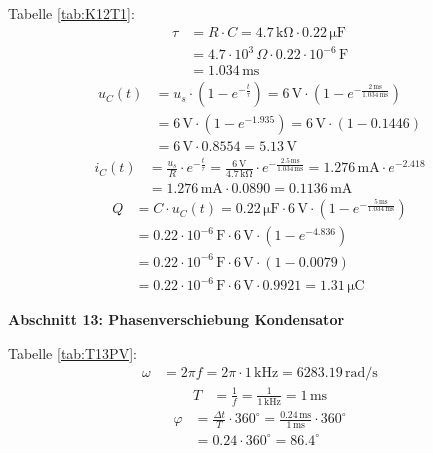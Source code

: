 Tabelle \ref{tab:K12T1}:
\begin{align*}
    \tau &= R \cdot C = 4.7 \, \mathrm{k\Omega} \cdot 0.22 \, \mathrm{\mu F} \\
    &= 4.7 \cdot 10^3 \, \Omega \cdot 0.22 \cdot 10^{-6} \, \mathrm{F} \\
    &= 1.034 \, \mathrm{ms}
\end{align*}
\begin{align*}
    u_C(t) &= u_s \cdot \left( 1 - e^{-\frac{t}{\tau}} \right) = 6 \, \mathrm{V} \cdot \left( 1 - e^{-\frac{2 \, \mathrm{ms}}{1.034 \, \mathrm{ms}}} \right) \\
    &= 6 \, \mathrm{V} \cdot \left( 1 - e^{-1.935} \right) = 6 \, \mathrm{V} \cdot \left( 1 - 0.1446 \right) \\
    &= 6 \, \mathrm{V} \cdot 0.8554 = 5.13 \, \mathrm{V}
\end{align*}
\begin{align*}
    i_C(t) &= \frac{u_s}{R} \cdot e^{-\frac{t}{\tau}} = \frac{6 \, \mathrm{V}}{4.7 \, \mathrm{k\Omega}} \cdot e^{-\frac{2.5 \, \mathrm{ms}}{1.034 \, \mathrm{ms}}} = 1.276 \, \mathrm{mA} \cdot e^{-2.418} \\
    &= 1.276 \, \mathrm{mA} \cdot 0.0890 = 0.1136 \, \mathrm{mA}
\end{align*}
\begin{align*}
    Q &= C \cdot u_C(t) = 0.22 \, \mathrm{\mu F} \cdot 6 \, \mathrm{V} \cdot \left( 1 - e^{-\frac{5 \, \mathrm{ms}}{1.034 \, \mathrm{ms}}} \right) \\
    &= 0.22 \cdot 10^{-6} \, \mathrm{F} \cdot 6 \, \mathrm{V} \cdot \left( 1 - e^{-4.836} \right) \\
    &= 0.22 \cdot 10^{-6} \, \mathrm{F} \cdot 6 \, \mathrm{V} \cdot \left( 1 - 0.0079 \right) \\
    &= 0.22 \cdot 10^{-6} \, \mathrm{F} \cdot 6 \, \mathrm{V} \cdot 0.9921 = 1.31 \, \mathrm{\mu C}
\end{align*}

\large \textbf{Abschnitt 13: Phasenverschiebung Kondensator}

Tabelle \ref{tab:T13PV}:
\begin{align*}
    \omega &= 2 \pi f = 2 \pi \cdot 1 \, \mathrm{kHz} = 6283.19 \, \mathrm{rad/s}
\end{align*}
\begin{align*}
    T &= \frac{1}{f} = \frac{1}{1 \, \mathrm{kHz}} = 1 \, \mathrm{ms}
\end{align*}
\begin{align*}
    \varphi &= \frac{\Delta t}{T} \cdot 360^\circ = \frac{0.24 \, \mathrm{ms}}{1 \, \mathrm{ms}} \cdot 360^\circ \\
    &= 0.24 \cdot 360^\circ = 86.4^\circ
\end{align*}

